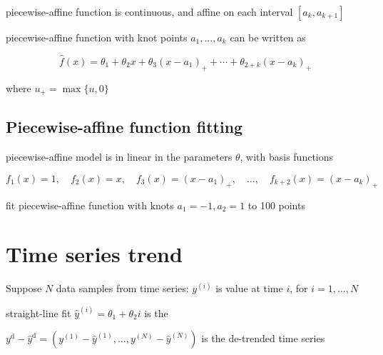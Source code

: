 \begin{proposition}
    piecewise-affine function is continuous, and affine on each interval $ \left[a_{k}, a_{k+1}\right] $
\end{proposition}

\begin{theorem}
    piecewise-affine function with knot points $ a_{1}, \ldots, a_{k} $ can be written as

    $$
    \hat{f}(x)=\theta_{1}+\theta_{2} x+\theta_{3}\left(x-a_{1}\right)_{+}+\cdots+\theta_{2+k}\left(x-a_{k}\right)_{+}
    $$

    where $ u_{+}=\max \{u, 0\} $
\end{theorem}



\subsection{Piecewise-affine function fitting}

piecewise-affine model is in linear in the parameters $ \theta $, with basis functions

$$
f_{1}(x)=1, \quad f_{2}(x)=x, \quad f_{3}(x)=\left(x-a_{1}\right)_{+}, \quad \ldots, \quad f_{k+2}(x)=\left(x-a_{k}\right)_{+}
$$

\begin{example}
    fit piecewise-affine function with knots $ a_{1}=-1, a_{2}=1 $ to 100 points


\end{example}

\section{Time series trend}

\begin{definition}
    Suppose $ N $ data samples from time series: $ y^{(i)} $ is value at time $ i $, for $ i=1, \ldots, N $

    straight-line fit $ \hat{y}^{(i)}=\theta_{1}+\theta_{2} i $ is the 
\end{definition}

\begin{definition}
    $ y^{\mathrm{d}}-\hat{y}^{\mathrm{d}}=\left(y^{(1)}-\hat{y}^{(1)}, \ldots, y^{(N)}-\hat{y}^{(N)}\right) $ is the de-trended time series
\end{definition}

